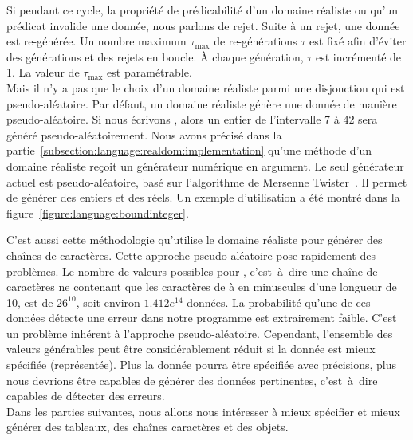 Si pendant ce cycle, la propriété de prédicabilité d'un domaine réaliste ou
qu'un prédicat invalide une donnée, nous parlons de {\strong rejet}. Suite à un
rejet, une donnée est re-générée. Un nombre maximum $\tau_\mathrm{max}$ de
re-générations $\tau$ est fixé afin d'éviter des générations et des rejets en
boucle. À chaque génération, $\tau$ est incrémenté de 1. La valeur de
$\tau_\mathrm{max}$ est paramétrable. \\

Mais il n'y a pas que le choix d'un domaine réaliste parmi une disjonction qui
est pseudo-aléatoire. Par défaut, un domaine réaliste génère une donnée de
manière pseudo-aléatoire.  Si nous écrivons , alors un
entier de l'intervalle 7 à 42 sera généré pseudo-aléatoirement. Nous avons
précisé dans la partie~\ref{subsection:language:realdom:implementation} qu'une
méthode  d'un domaine réaliste reçoit un générateur numérique en
argument. Le seul générateur actuel est pseudo-aléatoire, basé sur l'algorithme
de Mersenne Twister~. Il permet de générer des entiers et
des réels. Un exemple d'utilisation a été montré dans la
figure~\ref{figure:language:boundinteger}.

C'est aussi cette méthodologie qu'utilise le domaine réaliste  pour
générer des chaînes de caractères. Cette approche pseudo-aléatoire pose
rapidement des problèmes. Le nombre de valeurs possibles pour , c'est~à~dire une chaîne de caractères ne contenant que les caractères
de  à  en minuscules d'une longueur de 10, est de $26^{10}$,
soit environ $1.412e^{14}$ données. La probabilité qu'une de ces données détecte
une erreur dans notre programme est extrairement faible. C'est un problème
inhérent à l'approche pseudo-aléatoire. Cependant, l'ensemble des valeurs
générables peut être considérablement réduit si la donnée est mieux spécifiée
(représentée). Plus la donnée pourra être spécifiée avec précisions, plus nous
devrions être capables de générer des données pertinentes, c'est~à~dire capables
de détecter des erreurs. \\

Dans les parties suivantes, nous allons nous intéresser à mieux spécifier et
mieux générer des tableaux, des chaînes caractères et des objets.
